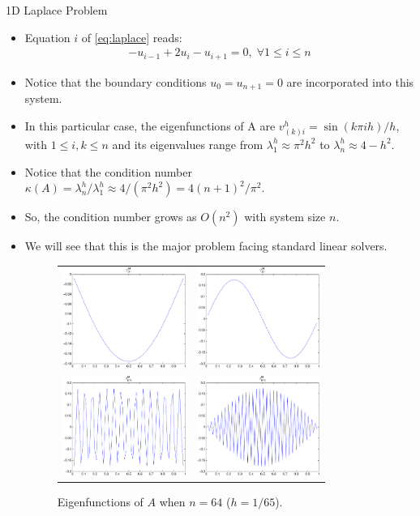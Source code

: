 \documentclass{beamer}
\begin{document}
\begin{frame}[allowframebreaks]{1D Laplace Problem}
\begin{itemize}
  \item Equation $i$ of \eqref{eq:laplace} reads:
  \begin{align}
   -u_{i-1}+2u_i-u_{i+1} = 0, \; \forall 1 \leq i \leq n
  \end{align}
  \item Notice that the boundary conditions $u_0 = u_{n+1} = 0$ are incorporated
        into this system.
  \item In this particular case, the eigenfunctions of A are $v^h_{(k)i} = \sin(k \pi ih)/h$,
        with $1 \leq i,k \leq n$ and its eigenvalues range from $\lambda_1^h \approx \pi^2 h^2$ to
        $\lambda_n^h \approx 4-h^2$.
  \item Notice that the condition number
        $\kappa(A) = \lambda_n^h / \lambda_1^h \approx 4/(\pi^2h^2) = 4(n+1)^2/\pi^2$.
  \item So, the condition number grows as $O(n^2)$ with system size $n$.
  \item We will see that this is the major problem facing standard linear solvers.
  \begin{figure}
   \begin{tabular}{cc}
    \includegraphics[width=4cm]{images/v64_1.pdf} & \includegraphics[width=4cm]{images/v64_2.pdf} \\
    \includegraphics[width=4cm]{images/v64_31.pdf} & \includegraphics[width=4cm]{images/v64_64.pdf}
   \end{tabular}
   \caption{Eigenfunctions of $A$ when $n=64$ ($h=1/65$).}
  \end{figure}
 \end{itemize}
\end{frame}
\end{document}
